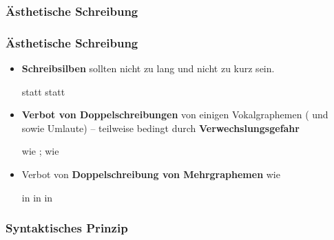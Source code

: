 \subsubsection{Ästhetische Schreibung}

\begin{frame}
\frametitle{Ästhetische Schreibung}

\begin{itemize}
	\item \textbf{Schreibsilben} sollten nicht zu lang und nicht zu kurz sein.
	
	\eal
	\ex {} statt 
	\ex {} statt 
	\zl

\pause 
	
	\item \textbf{Verbot von Doppelschreibungen} von einigen Vokalgraphemen ( und  sowie Umlaute) -- teilweise bedingt durch \textbf{Verwechslungsgefahr}
	
	\ea
	 wie ;  wie 
	\z
	
\pause 
		
	\item Verbot von \textbf{Doppelschreibung von Mehrgraphemen} wie
	
	\eal
		\ex {} in 
		\ex {} in  
		\ex {} in 
	\zl
	
\end{itemize}

\end{frame}


\subsubsection{Syntaktisches Prinzip}

